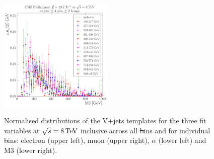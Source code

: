 \begin{figure}[hbtp]
     \includegraphics[width=0.48\textwidth]{Chapters/04_Analysis/04b_XSections/images/8TeV/fit_variables/ST/M3/vjets/ST_M3_2orMoreBtags_VJets_template_comparison.pdf}\\
	 \caption{Normalised distributions of the V+jets templates for the three fit variables at $\sqrt{s}=8\,\text{Te\hspace{-.08em}V}$
	 inclusive across all \st bins and for individual \st bins: electron \abseta (upper
	 left), muon \abseta (upper right), $\alpha$ (lower left) and M3 (lower right).}
     \label{fig:ST_fit_variable_vjets_comparisons_8TeV}
\end{figure}

